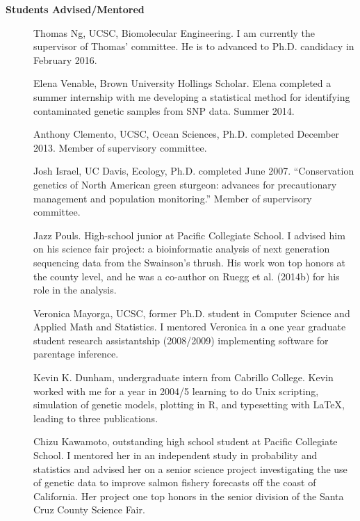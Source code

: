 \documentclass[11pt]{article}
\newlength{\postskip}
\begin{document}
{\bf Students Advised/Mentored}
\begin{description}
\item[] Thomas Ng, UCSC, Biomolecular Engineering.  I am currently the supervisor of Thomas' committee.  He is to
advanced to Ph.D. candidacy in February 2016.
\item[] Elena Venable, Brown University Hollings Scholar.  Elena completed a summer internship with me developing 
a statistical method for identifying contaminated genetic samples from SNP data. Summer 2014.
\item[] Anthony Clemento, UCSC, Ocean Sciences, Ph.D. completed December 2013.  Member of supervisory committee.
\item[] Josh Israel, UC Davis, Ecology,  Ph.D. completed June 2007. ``Conservation genetics of North American green sturgeon: advances for precautionary management and population monitoring.'' Member of supervisory committee.
\item[] Jazz Pouls.  High-school junior at Pacific Collegiate School.  I advised him on his science fair project:
a bioinformatic analysis of next generation sequencing data from the Swainson's thrush.  His work won top honors
at the county level, and he was a co-author on Ruegg et al. (2014b) for his role in the analysis.
\item[] Veronica Mayorga, UCSC,  former Ph.D. student in Computer Science and Applied Math and Statistics. I mentored Veronica in a one year graduate student research assistantship (2008/2009) implementing software for parentage inference.
\item[] Kevin K. Dunham,  undergraduate intern from Cabrillo College.  Kevin worked with me for a year in 2004/5 learning to do Unix scripting, simulation of genetic models, plotting in R, and typesetting with \LaTeX{}, leading to three publications. 
\item[] Chizu Kawamoto, outstanding high school student at Pacific Collegiate School.  I mentored her in an independent study in probability and statistics and advised her on a senior science project investigating the use of genetic data to improve salmon fishery forecasts off the coast of California.  Her project one top honors in the senior division of the Santa Cruz County Science Fair.

\end{description}
\vspace*{\postskip}


\nocite{*}
\end{document}
